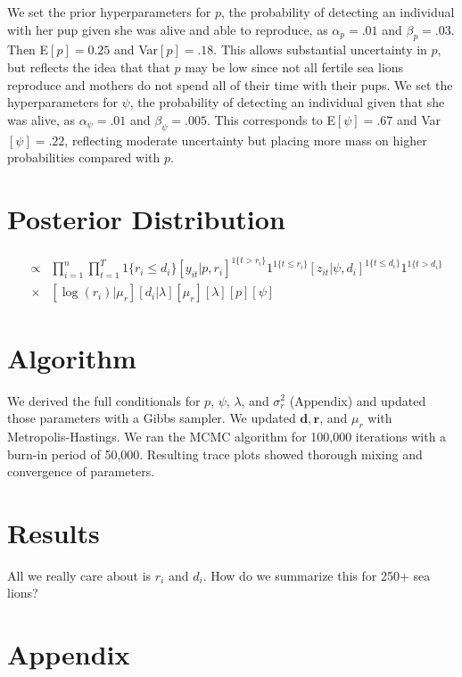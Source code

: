 \documentclass[12pt, a4paper]{article}
\begin{document}
We set the prior hyperparameters for $p$, the probability of detecting an individual with her pup given she was alive and able to reproduce, as $\alpha_p = .01$ and $\beta_p = .03$. Then E$[p] = 0.25$ and Var$[p] = .18$. This allows substantial uncertainty in $p$, but reflects the idea that that $p$ may be low since not all fertile sea lions reproduce and mothers do not spend all of their time with their pups. We set the hyperparameters for $\psi$, the probability of detecting an individual given that she was alive, as $\alpha_{\psi} = .01$ and $\beta_{\psi} = .005$. This corresponds to E$[\psi] = .67$ and Var$[\psi] = .22$, reflecting moderate uncertainty but placing more mass on higher probabilities compared with $p$. 

\section{Posterior Distribution}

\begin{eqnarray*}
[\log (\mathbf{r}), \mu_r, p, \mathbf{d}, \lambda, \psi | \mathbf{z}, \mathbf{y} ] & \propto & \prod_{i=1}^n \prod_{t=1} ^T  1\{r_i \leq d_i \} [y_{it}|p,r_i]^{1\{ t > r_i \}} 1^{1\{ t \leq r_i \}} [z_{it}|\psi, d_i]^{1 \{ t \leq d_i\} } 1^{1 \{ t > d_i\}} \\
  & \times & [\log(r_i)|\mu_r][d_i|\lambda]  [\mu_r][\lambda][p][\psi]
\end{eqnarray*}


\section{Algorithm}

We derived the full conditionals for $p$, $\psi$, $\lambda$, and $\sigma_r^2$ (Appendix) and updated those parameters with a Gibbs sampler. We updated $\mathbf{d}, \mathbf{r}$, and $\mu_r$ with Metropolis-Hastings. We ran the MCMC algorithm for 100,000 iterations with a burn-in period of 50,000. Resulting trace plots showed thorough mixing and convergence of parameters. 

\section{Results}

All we really care about is $r_i$ and $d_i$. How do we summarize this for 250+ sea lions? 

\section{Appendix}
\end{document}
